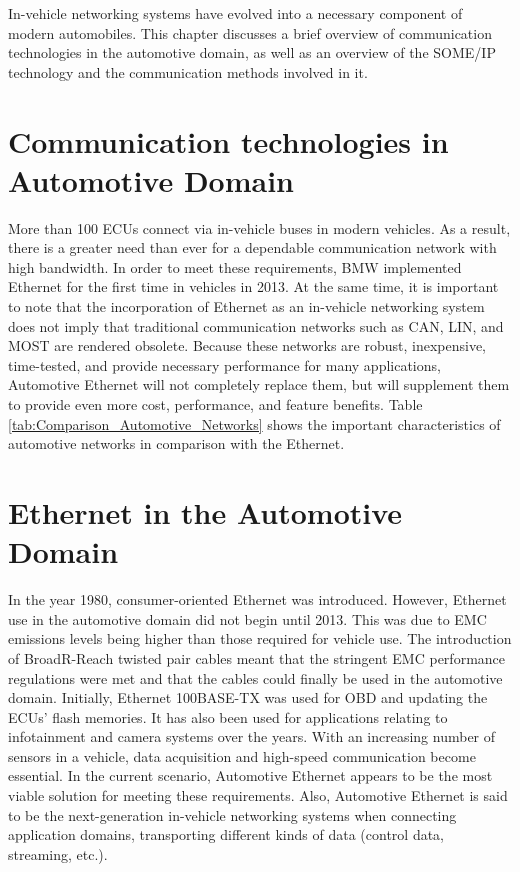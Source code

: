 In-vehicle networking systems have evolved into a necessary component of modern automobiles. This chapter discusses a brief overview of communication technologies in the automotive domain, as well as an overview of the SOME/IP technology and the communication methods involved in it.

\section{Communication technologies in Automotive Domain}
More than 100 ECUs connect via in-vehicle buses in modern vehicles\cite{b1.0}. As a result, there is a greater need than ever for a dependable communication network with high bandwidth. In order to meet these requirements, BMW implemented Ethernet for the first time in vehicles in 2013. At the same time, it is important to note that the incorporation of Ethernet as an in-vehicle networking system does not imply that traditional communication networks such as CAN, LIN, and MOST are rendered obsolete. Because these networks are robust, inexpensive, time-tested, and provide necessary performance for many applications, Automotive Ethernet will not completely replace them, but will supplement them to provide even more cost, performance, and feature benefits. Table \ref{tab:Comparison_Automotive_Networks} shows the important characteristics of automotive networks in comparison with the Ethernet.


\section{Ethernet in the Automotive Domain}
\label{sec:EthernetInTheAutomotiveDomain}
In the year 1980, consumer-oriented Ethernet was introduced. However, Ethernet use in the automotive domain did not begin until 2013. This was due to EMC emissions levels being higher than those required for vehicle use. The introduction of BroadR-Reach twisted pair cables meant that the stringent EMC performance regulations were met and that the cables could finally be used in the automotive domain. Initially, Ethernet 100BASE-TX was used for OBD and updating the ECUs' flash memories\cite{b1.0.1_AE_History}. It has also been used for applications relating to infotainment and camera systems over the years. With an increasing number of sensors in a vehicle, data acquisition and high-speed communication become essential. In the current scenario, Automotive Ethernet appears to be the most viable solution for meeting these requirements. Also, Automotive Ethernet is said to be the next-generation in-vehicle networking systems when connecting application domains, transporting different kinds of data (control data, streaming, etc.)\cite{b1.0.1_AE_History}.  

